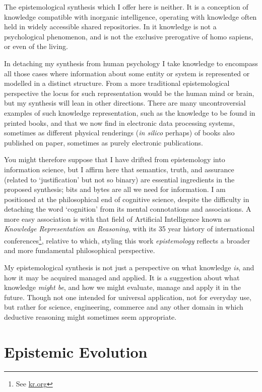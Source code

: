 \documentclass[10pt,titlepage]{book}
\begin{document}
The epistemological synthesis which I offer here is neither.
It is a conception of knowledge compatible with inorganic intelligence, operating with knowledge often held in widely accessible shared repositories.
In it knowledge is not a psychological phenomenon, and is not the exclusive prerogative of homo sapiens, or even of the living.

In detaching my synthesis from human psychology I take knowledge to encompass all those cases where information about some entity or system is represented or modelled in a distinct structure.
From a more traditional epistemological perspective the locus for such representation would be the human mind or brain, but my synthesis will lean in other directions.
There are many uncontroversial examples of such knowledge representation, such as the knowledge to be found in printed books, and that we now find in electronic data processing systems, sometimes as different physical renderings (\emph{in silico} perhaps) of books also published on paper, sometimes as purely electronic publications.

You might therefore suppose that I have drifted from epistemology into information science, but I affirm here that semantics, truth, and assurance (related to `justification' but not so binary) are essential ingredients in the proposed synthesis; bits and bytes are all we need for information.
I am positioned at the philosophical end of cognitive science, despite the difficulty in detaching the word `cognition' from its mental connotations and associations.
A more easy association is with that field of Artificial Intelligence known as \emph{Knowledge Representation an Reasoning}, with its 35 year history of international conferences\footnote{See \href{http://kr.org/}{kr.org}}, relative to which, styling this work \emph{epistemology} reflects a broader and more fundamental philosophical perspective.

My epistemological synthesis is not just a perspective on what knowledge \emph{is}, and how it may be acquired managed and applied.
It is a suggestion about what knowledge \emph{might be}, and how we might evaluate, manage and apply it in the future.
Though not one intended for universal application, not for everyday use, but rather for science, engineering, commerce and any other domain in which deductive reasoning might sometimes seem appropriate.

\section{Epistemic Evolution}
\end{document}
